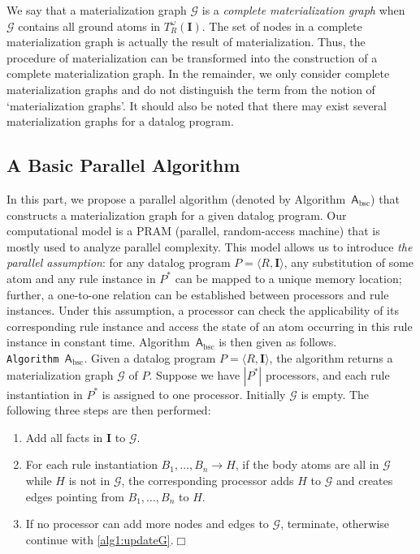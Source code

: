 We say that a materialization graph $\mathcal{G}$ is a \emph{complete materialization graph}
when $\mathcal{G}$ contains all ground atoms in $T_R^{\omega}(\textbf{I})$.
The set of nodes in a complete materialization graph is actually the result
of materialization.
Thus, the procedure of materialization can be transformed into the construction of
a complete materialization graph.
In the remainder, we only consider complete materialization graphs and
do not distinguish the term from the
notion of `materialization graphs'.
It should also be noted that there may exist several materialization graphs for a datalog program.


\subsection{A Basic Parallel Algorithm}
\label{sec:alg-bsc}

In this part, we propose a parallel algorithm
(denoted by Algorithm~$\mathsf{A}_{\text{bsc}}$) that constructs a materialization graph for a given datalog program.
Our computational model is a PRAM (parallel, random-access machine) that is mostly used to analyze parallel
complexity. This model allows us to introduce \emph{the parallel assumption}:
for any datalog program $P=\langle R, \textbf{I}\rangle$,
any substitution of some atom and any rule instance in $P^*$ can be mapped to a unique memory
location; further, a one-to-one relation can be established between processors and rule instances.
Under this assumption, a processor can check the applicability of its corresponding
rule instance and access the state of an atom occurring in this rule instance in constant time.
Algorithm~$\mathsf{A}_{\text{bsc}}$ is then given as follows.\\


\noindent\texttt{Algorithm~$\mathsf{A}_{\text{bsc}}$}. Given a datalog program $P=\langle R, \textbf{I}\rangle$,
the algorithm returns a materialization graph $\mathcal{G}$ of $P$.
Suppose we have $|P^*|$ processors, and each rule instantiation in $P^*$ is
assigned to one processor.
Initially $\mathcal{G}$ is empty. The following three steps are then performed:
\begin{enumerate}[leftmargin=8ex,label=(\textit{Step \arabic*}),ref=Step~\arabic*]
\item Add all facts in $\textbf{I}$ to $\mathcal{G}$.\label{alg1:addFacts}
\item For each rule instantiation $B_1,\ldots,B_n\rightarrow H$, if the body atoms are all
    in $\mathcal{G}$ while $H$ is not in $\mathcal{G}$,
    the corresponding processor adds $H$ to $\mathcal{G}$ and creates edges pointing
    from $B_1,\ldots,B_n$ to $H$.\label{alg1:updateG}
\item If no processor can add more nodes and edges to $\mathcal{G}$,
  terminate, otherwise continue with \ref{alg1:updateG}.\label{alg1:halt}\hfill$\Box$
\end{enumerate}

